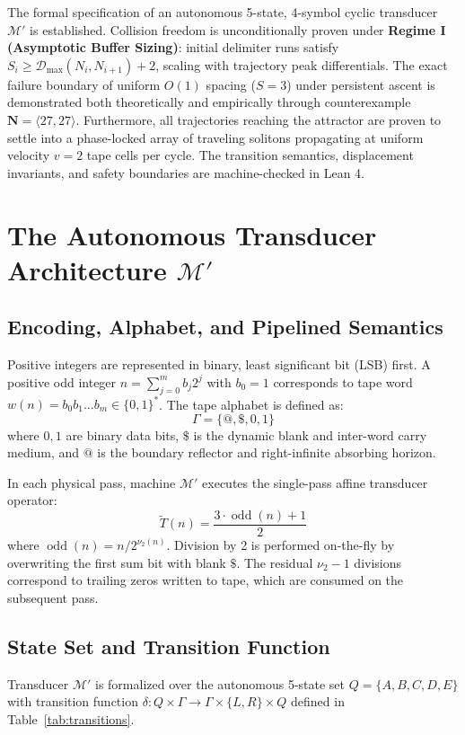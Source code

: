 \documentclass[journal,10pt,twocolumn]{IEEEtran}
\DeclareMathOperator{\oddcore}{odd}
\begin{document}
The formal specification of an autonomous 5-state, 4-symbol cyclic transducer $\mathcal{M}'$ is established. Collision freedom is unconditionally proven under \textbf{Regime I (Asymptotic Buffer Sizing)}: initial delimiter runs satisfy $S_i \ge \mathcal{D}_{\max}(N_i, N_{i+1}) + 2$, scaling with trajectory peak differentials. The exact failure boundary of uniform $O(1)$ spacing ($S = 3$) under persistent ascent is demonstrated both theoretically and empirically through counterexample $\mathbf{N} = \langle 27, 27 \rangle$. Furthermore, all trajectories reaching the attractor are proven to settle into a phase-locked array of traveling solitons propagating at uniform velocity $v = 2$ tape cells per cycle. The transition semantics, displacement invariants, and safety boundaries are machine-checked in Lean 4.

\section{The Autonomous Transducer Architecture \texorpdfstring{$\mathcal{M}'$}{M'}}

\subsection{Encoding, Alphabet, and Pipelined Semantics}
Positive integers are represented in binary, least significant bit (LSB) first. A positive odd integer $n = \sum_{j=0}^m b_j 2^j$ with $b_0 = 1$ corresponds to tape word $w(n) = b_0 b_1 \dots b_m \in \{0, 1\}^*$.
The tape alphabet is defined as:
\begin{equation}
\Gamma = \{@, \$, 0, 1\}
\end{equation}
where $0, 1$ are binary data bits, $\$$ is the dynamic blank and inter-word carry medium, and $@$ is the boundary reflector and right-infinite absorbing horizon.

In each physical pass, machine $\mathcal{M}'$ executes the single-pass affine transducer operator:
\begin{equation}
\widetilde{T}(n) = \frac{3 \cdot \oddcore(n) + 1}{2}
\label{eq:affine_map}
\end{equation}
where $\oddcore(n) = n / 2^{\nu_2(n)}$. Division by 2 is performed on-the-fly by overwriting the first sum bit with blank $\$$. The residual $\nu_2 - 1$ divisions correspond to trailing zeros written to tape, which are consumed on the subsequent pass.

\subsection{State Set and Transition Function}
Transducer $\mathcal{M}'$ is formalized over the autonomous 5-state set $Q = \{A, B, C, D, E\}$ with transition function $\delta : Q \times \Gamma \to \Gamma \times \{L, R\} \times Q$ defined in Table~\ref{tab:transitions}.
\end{document}
